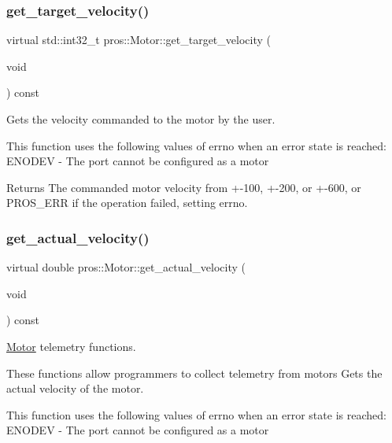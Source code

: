 \subsubsection{\texorpdfstring{get\+\_\+target\+\_\+velocity()}{get\_target\_velocity()}}
{\footnotesize\ttfamily virtual std\+::int32\+\_\+t pros\+::\+Motor\+::get\+\_\+target\+\_\+velocity (\begin{DoxyParamCaption}\item[{void}]{ }\end{DoxyParamCaption}) const\hspace{0.3cm}{\ttfamily [virtual]}}



Gets the velocity commanded to the motor by the user. 

This function uses the following values of errno when an error state is reached\+: E\+N\+O\+D\+EV -\/ The port cannot be configured as a motor

\begin{DoxyReturn}{Returns}
The commanded motor velocity from +-\/100, +-\/200, or +-\/600, or P\+R\+O\+S\+\_\+\+E\+RR if the operation failed, setting errno. 
\end{DoxyReturn}
\mbox{\label{classpros_1_1Motor_a696494a4e7c675f7007d41b947f9ea63}} 
\subsubsection{\texorpdfstring{get\+\_\+actual\+\_\+velocity()}{get\_actual\_velocity()}}
{\footnotesize\ttfamily virtual double pros\+::\+Motor\+::get\+\_\+actual\+\_\+velocity (\begin{DoxyParamCaption}\item[{void}]{ }\end{DoxyParamCaption}) const\hspace{0.3cm}{\ttfamily [virtual]}}



\hyperlink{classpros_1_1Motor}{Motor} telemetry functions. 

These functions allow programmers to collect telemetry from motors Gets the actual velocity of the motor.

This function uses the following values of errno when an error state is reached\+: E\+N\+O\+D\+EV -\/ The port cannot be configured as a motor

